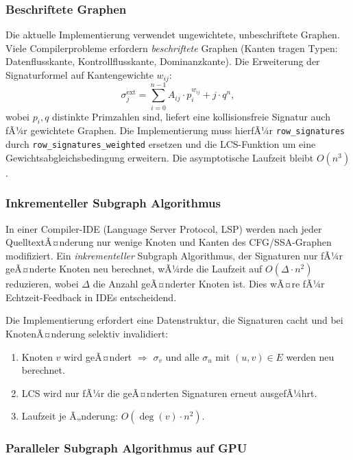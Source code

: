 ﻿\documentclass[a4paper,12pt]{article}
\theoremstyle{definition}
\begin{document}
\subsubsection{Beschriftete Graphen}

Die aktuelle Implementierung verwendet ungewichtete, unbeschriftete
Graphen. Viele Compilerprobleme erfordern \emph{beschriftete} Graphen
(Kanten tragen Typen: Datenflusskante, Kontrollflusskante,
Dominanzkante). Die Erweiterung der Signaturformel auf Kantengewichte
$w_{ij}$:
\[
\sigma_j^{\mathrm{ext}} = \sum_{i=0}^{n-1} A_{ij} \cdot p_i^{w_{ij}} + j \cdot q^n,
\]
wobei $p_i, q$ distinkte Primzahlen sind, liefert eine kollisionsfreie
Signatur auch fÃ¼r gewichtete Graphen. Die Implementierung muss hierfÃ¼r
\texttt{row\_signatures} durch \texttt{row\_signatures\_weig\newline hted} ersetzen
und die LCS-Funktion um eine Gewichtsabgleichsbedingung erweitern. Die
asymptotische Laufzeit bleibt $O(n^3)$.

\subsubsection{Inkrementeller Subgraph Algorithmus}

In einer Compiler-IDE (Language Server Protocol, LSP) werden nach jeder
QuelltextÃ¤nder\-ung nur wenige Knoten und Kanten des CFG/SSA-Graphen
modifiziert. Ein \emph{inkrementeller} Subgraph Algorithmus, der
Signaturen nur fÃ¼r geÃ¤nderte Knoten neu berechnet, wÃ¼rde die Laufzeit
auf $O(\Delta \cdot n^2)$ reduzieren, wobei $\Delta$ die Anzahl
geÃ¤nderter Knoten ist. Dies wÃ¤re fÃ¼r Echtzeit-Feedback in IDEs
entscheidend.

Die Implementierung erfordert eine Datenstruktur, die Signaturen
cacht und bei KnotenÃ¤nderung selektiv invalidiert:
\begin{enumerate}
	\item Knoten $v$ wird geÃ¤ndert $\Rightarrow$ $\sigma_v$ und alle
	$\sigma_u$ mit $(u,v) \in E$ werden neu berechnet.
	\item LCS wird nur fÃ¼r die geÃ¤nderten Signaturen erneut ausgefÃ¼hrt.
	\item Laufzeit je Ã„nderung: $O(\deg(v) \cdot n^2)$.
\end{enumerate}

\subsubsection{Paralleler Subgraph Algorithmus auf GPU}
\end{document}
